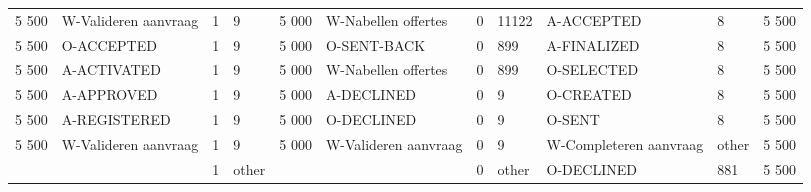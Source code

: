 \begin{tabular}{llllllllllr}
5 500 & W-Valideren aanvraag & 1 & 9 & 5 000 & W-Nabellen offertes & 0 & 11122 & A-ACCEPTED & 8 & 5 500 \\
5 500 & O-ACCEPTED & 1 & 9 & 5 000 & O-SENT-BACK & 0 & 899 & A-FINALIZED & 8 & 5 500 \\
5 500 & A-ACTIVATED & 1 & 9 & 5 000 & W-Nabellen offertes & 0 & 899 & O-SELECTED & 8 & 5 500 \\
5 500 & A-APPROVED & 1 & 9 & 5 000 & A-DECLINED & 0 & 9 & O-CREATED & 8 & 5 500 \\
5 500 & A-REGISTERED & 1 & 9 & 5 000 & O-DECLINED & 0 & 9 & O-SENT & 8 & 5 500 \\
5 500 & W-Valideren aanvraag & 1 & 9 & 5 000 & W-Valideren aanvraag & 0 & 9 & W-Completeren aanvraag & other & 5 500 \\
 &  & 1 & other &  &  & 0 & other & O-DECLINED & 881 & 5 500 \\
\bottomrule
\end{tabular}
